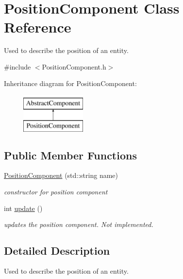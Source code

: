 \hypertarget{class_position_component}{\section{Position\-Component Class Reference}
\label{d2/d9c/class_position_component}
}


Used to describe the position of an entity.  




{\ttfamily \#include $<$Position\-Component.\-h$>$}

Inheritance diagram for Position\-Component\-:\begin{figure}[H]
\begin{center}
\leavevmode
\includegraphics[height=2.000000cm]{d2/d9c/class_position_component}
\end{center}
\end{figure}
\subsection*{Public Member Functions}
\begin{DoxyCompactItemize}
\item 
\hyperlink{class_position_component_af36423e068f4c960b7b620fb76ae16b7}{Position\-Component} (std\-::string name)
\begin{DoxyCompactList}\small\item\em constructor for position component \end{DoxyCompactList}\item 
\hypertarget{class_position_component_a1c966c7291bcf3b8c8101bb70f046f7f}{int \hyperlink{class_position_component_a1c966c7291bcf3b8c8101bb70f046f7f}{update} ()}\label{d2/d9c/class_position_component_a1c966c7291bcf3b8c8101bb70f046f7f}

\begin{DoxyCompactList}\small\item\em updates the position component. Not implemented. \end{DoxyCompactList}\end{DoxyCompactItemize}


\subsection{Detailed Description}
Used to describe the position of an entity. 

